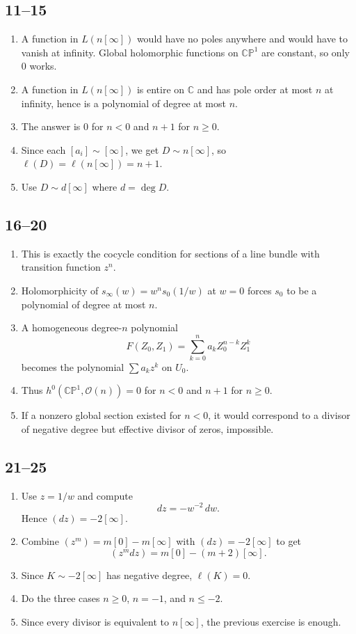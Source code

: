 \documentclass[11pt]{article}
\newcommand{\C}{\mathbb{C}}
\newcommand{\CP}{\mathbb{CP}}
\newcommand{\OO}{\mathcal{O}}
\newcommand{\degd}{\operatorname{deg}}
\newcommand{\ellD}{\ell}
\newcommand{\CPone}{\CP^1}
\theoremstyle{definition}
\theoremstyle{plain}
\begin{document}
\subsection*{11--15}
\begin{enumerate}[label=\textbf{\arabic*.}, leftmargin=2.5em, start=11]
    \item A function in $L(n[\infty])$ would have no poles anywhere and would have to vanish at infinity. Global holomorphic functions on $\CPone$ are constant, so only $0$ works.
    \item A function in $L(n[\infty])$ is entire on $\C$ and has pole order at most $n$ at infinity, hence is a polynomial of degree at most $n$.
    \item The answer is $0$ for $n<0$ and $n+1$ for $n\ge 0$.
    \item Since each $[a_i]\sim [\infty]$, we get $D\sim n[\infty]$, so $\ellD(D)=\ellD(n[\infty])=n+1$.
    \item Use $D\sim d[\infty]$ where $d=\degd D$.
\end{enumerate}

\subsection*{16--20}
\begin{enumerate}[label=\textbf{\arabic*.}, leftmargin=2.5em, start=16]
    \item This is exactly the cocycle condition for sections of a line bundle with transition function $z^n$.
    \item Holomorphicity of $s_\infty(w)=w^n s_0(1/w)$ at $w=0$ forces $s_0$ to be a polynomial of degree at most $n$.
    \item A homogeneous degree-$n$ polynomial
    \[
    F(Z_0,Z_1)=\sum_{k=0}^n a_k Z_0^{n-k}Z_1^k
    \]
    becomes the polynomial $\sum a_k z^k$ on $U_0$.
    \item Thus $h^0(\CPone,\OO(n))=0$ for $n<0$ and $n+1$ for $n\ge 0$.
    \item If a nonzero global section existed for $n<0$, it would correspond to a divisor of negative degree but effective divisor of zeros, impossible.
\end{enumerate}

\subsection*{21--25}
\begin{enumerate}[label=\textbf{\arabic*.}, leftmargin=2.5em, start=21]
    \item Use $z=1/w$ and compute
    \[
    dz=-w^{-2}\,dw.
    \]
    Hence $(dz)=-2[\infty]$.
    \item Combine $(z^m)=m[0]-m[\infty]$ with $(dz)=-2[\infty]$ to get
    \[
    (z^m dz)=m[0]-(m+2)[\infty].
    \]
    \item Since $K\sim -2[\infty]$ has negative degree, $\ellD(K)=0$.
    \item Do the three cases $n\ge 0$, $n=-1$, and $n\le -2$.
    \item Since every divisor is equivalent to $n[\infty]$, the previous exercise is enough.
\end{enumerate}
\end{document}
